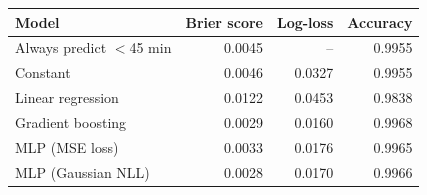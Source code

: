 \begin{tabular}{lrrr}
\toprule
Model & Brier score & Log-loss & Accuracy \\
\midrule
Always predict $<$45 min & 0.0045 & -- & 0.9955 \\
Constant & 0.0046 & 0.0327 & 0.9955 \\
Linear regression & 0.0122 & 0.0453 & 0.9838 \\
Gradient boosting & 0.0029 & 0.0160 & 0.9968 \\
MLP (MSE loss) & 0.0033 & 0.0176 & 0.9965 \\
MLP (Gaussian NLL) & 0.0028 & 0.0170 & 0.9966 \\
\bottomrule
\end{tabular}

